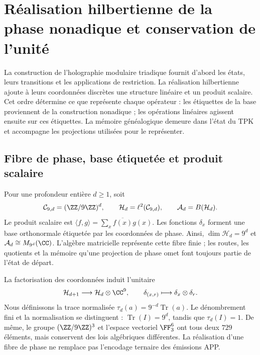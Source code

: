 \section{Réalisation hilbertienne de la phase nonadique et conservation de l’unité}
\label{iv:hilbert}

La construction de l'holographie modulaire triadique fournit d'abord les états, leurs transitions et les applications de restriction. La réalisation hilbertienne ajoute à leurs coordonnées discrètes une structure linéaire et un produit scalaire. Cet ordre détermine ce que représente chaque opérateur : les étiquettes de la base proviennent de la construction nonadique ; les opérations linéaires agissent ensuite sur ces étiquettes. La mémoire généalogique demeure dans l'état du TPK et accompagne les projections utilisées pour le représenter.

\subsection{Fibre de phase, base étiquetée et produit scalaire}

Pour une profondeur entière \(d\geq1\), soit
\begin{equation}
 \mathcal C_{9,d}=(\ZZ/9\ZZ)^d,
 \qquad \mathcal H_d=\ell^2(\mathcal C_{9,d}),
 \qquad \mathcal A_d=B(\mathcal H_d).
 \label{iv:eq:hilbert-finito}
\end{equation}
Le produit scalaire est
\(\langle f,g\rangle=\sum_x\overline{f(x)}g(x)\). Les fonctions
\(\delta_x\) forment une base orthonormale étiquetée par les coordonnées
de phase. Ainsi, \(\dim\mathcal H_d=9^d\) et
\(\mathcal A_d\cong M_{9^d}(\CC)\). L’algèbre matricielle représente
cette fibre finie ; les routes, les quotients et la mémoire qu’une
projection de phase omet font toujours partie de l’état de départ.

La factorisation des coordonnées induit l’unitaire
\begin{equation}
 \mathcal H_{d+1}\longrightarrow\mathcal H_d\otimes\CC^9,
 \qquad \delta_{(x,r)}\longmapsto\delta_x\otimes\delta_r.
 \label{iv:eq:factorizacion-hilbert}
\end{equation}
Nous définissons la trace normalisée
\(\tau_d(a)=9^{-d}\operatorname{Tr}(a)\). Le dénombrement fini et la
normalisation se distinguent : \(\operatorname{Tr}(I)=9^d\), tandis
que \(\tau_d(I)=1\). De même, le groupe \((\ZZ/9\ZZ)^3\) et l’espace
vectoriel \(\FF_3^6\) ont tous deux \(729\) éléments, mais
conservent des lois algébriques différentes. La réalisation d’une fibre de
phase ne remplace pas l’encodage ternaire des émissions APP.

